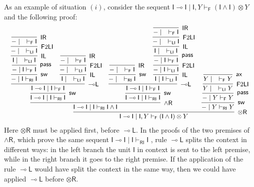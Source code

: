 \documentclass[submission,copyright,creativecommons]{eptcs}
\theoremstyle{definition}
\newcommand{\tr}{\otimes \mathsf{R}}
\newcommand{\lleft}{{\multimap}\mathsf{L}}
\newcommand{\pass}{\mathsf{pass}}
\newcommand{\unitl}{\mathsf{IL}}
\newcommand{\unitr}{\mathsf{IR}}
\newcommand{\andr}{\land \mathsf{R}}
\newcommand{\ax}{\mathsf{ax}}
\newcommand{\ot}{\otimes}
\newcommand{\lolli}{\multimap}
\newcommand{\I}{\mathsf{I}}
\newcommand{\RI}{\mathsf{RI}}
\newcommand{\LI}{\mathsf{LI}}
\newcommand{\F}{\mathsf{F}}
\newcommand{\sw}{\mathsf{sw}}
\begin{document}
As an example of situation $(i)$, consider the sequent $\I \lolli \I \mid \I , Y \vdash_\F (\I \land \I) \ot Y$ and the following proof:
\begin{equation}\label{eq:ex:lleft:NonDeter}
  \small
  \begin{array}{c}
    \infer[\tr]{\I \lolli \I \mid \I , Y \vdash_\F (\I \land \I) \ot Y}{
      \infer[\andr]{\I \lolli \I \mid \I \vdash_\RI \I \land \I}{
  \infer[\sw]{\I \lolli \I \mid \I \vdash_\RI \I}{
    \infer[\lleft]{\I \lolli \I \mid \I \vdash_\F \I}{
      \infer[\sw]{- \mid \I \vdash_\RI \I}{
      \infer[\pass]{- \mid \I \vdash_\F \I}{
        \infer[\unitl]{\I \mid \quad \vdash_\LI \I}{
          \infer[\F 2 \LI]{- \mid \quad \vdash_\LI \I}{
          \infer[\unitr]{- \mid \quad \vdash_\F \I}{}}
        }
      }}
      &
      \infer[\unitl]{\I \mid \quad \vdash_\LI \I}{
        \infer[\F 2 \LI]{- \mid \quad \vdash_\LI \I}{
        \infer[\unitr]{- \mid \quad \vdash_\F \I}{}
      }}
    }
      }        
    &
   \infer[\sw]{\I \lolli \I \mid \I \vdash_\RI \I}{
        \infer[\lleft]{\I \lolli \I \mid \I \vdash_\F \I}{
      \infer[\sw]{- \mid \quad \vdash_\RI \I}{
      \infer[\unitr]{- \mid \quad \vdash_\F \I}{}}
      &
      \infer[\unitl]{\I \mid \I \vdash_\LI \I}{
        \infer[\F 2 \LI]{- \mid \I \vdash_\LI \I}{
        \infer[\pass]{- \mid \I \vdash_\F \I}{
          \infer[\unitl]{\I \mid \quad \vdash_\LI \I}{
            \infer[\F 2 \LI]{- \mid \quad \vdash_\LI \I}{
            \infer[\unitr]{- \mid \quad \vdash_\F \I}{}}
          }
        }
      }
    }}}}    
      &
      \infer[\sw]{- \mid Y \vdash_\RI Y}{
      \infer[\pass]{- \mid Y \vdash_\F Y}{
        \infer[\F 2 \LI]{Y \mid \quad \vdash_\LI Y}{
        \infer[\ax]{Y \mid \quad \vdash_\F Y}{}}
      }}
    }
  \end{array}
\end{equation}
Here $\tr$ must be applied first, before $\lleft$. In the proofs of the two premises of $\andr$, which prove the same sequent $\I \lolli \I \mid \I \vdash_\RI \I$ , rule $\lleft$ splits the context in different ways: in the left branch the unit $\I$ in context is sent to the left premise, while in the right branch it goes to the right premise. If the application of the rule $\lleft$ would have split the context in the same way, then we could have applied $\lleft$ before $\tr$.
\end{document}
